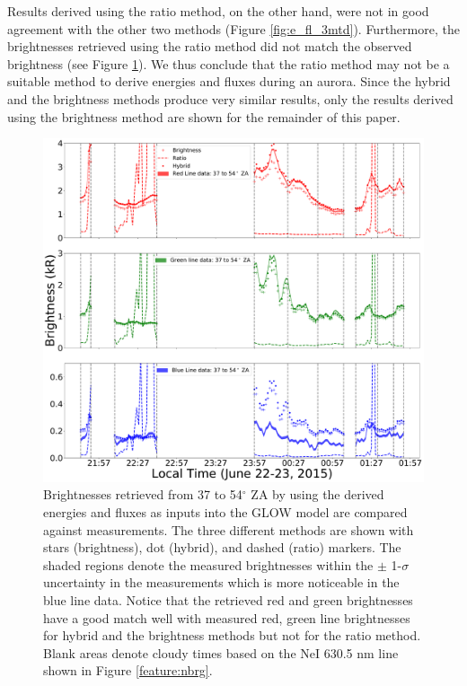 \documentclass[crop=false,class=mitthesis,oneside,font=12pt]{standalone}
\begin{document}
Results derived using the ratio method, on the other hand, were not in good agreement with the other two methods (Figure \ref{fig:e_fl_3mtd}). Furthermore, the brightnesses retrieved using the ratio method did not match the observed brightness (see Figure \ref{fig:e_fl_b_comp}). We thus conclude that the ratio method may not be a suitable method to derive energies and fluxes during an aurora. Since the hybrid and the brightness methods produce very similar results, only the results derived using the brightness method are shown for the remainder of this paper.
\begin{figure}[H]
	\centering\includegraphics[width=35pc]{different_method_retriv_comp.pdf}
	\caption{Brightnesses retrieved from 37 to 54$^\circ$ ZA by using the derived energies and fluxes as inputs into the GLOW model are compared against measurements. The three different methods are shown with stars (brightness), dot (hybrid), and dashed (ratio) markers. The shaded regions denote the measured brightnesses within the $\pm$ 1-$\sigma$ uncertainty in the measurements which is more noticeable in the blue line data. Notice that the retrieved red and green brightnesses have a good match well with measured red, green line brightnesses for hybrid and the brightness methods but not for the ratio method. Blank areas denote cloudy times based on the NeI 630.5 nm line shown in Figure \ref{feature:nbrg}.}
	\label{fig:e_fl_b_comp}
\end{figure}
\end{document}
